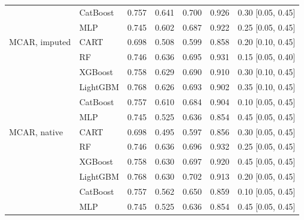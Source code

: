 \begin{table}[p]
\begin{tabular}{@{}llrrrrl@{}}
 & CatBoost & 0.757 & 0.641 & 0.700 & 0.926 & 0.30 [0.05, 0.45] \\
 & MLP & 0.745 & 0.602 & 0.687 & 0.922 & 0.25 [0.05, 0.45] \\
\midrule
MCAR, imputed & CART & 0.698 & 0.508 & 0.599 & 0.858 & 0.20 [0.10, 0.45] \\
 & RF & 0.746 & 0.636 & 0.695 & 0.931 & 0.15 [0.05, 0.40] \\
 & XGBoost & 0.758 & 0.629 & 0.690 & 0.910 & 0.30 [0.10, 0.45] \\
 & LightGBM & 0.768 & 0.626 & 0.693 & 0.902 & 0.35 [0.10, 0.45] \\
 & CatBoost & 0.757 & 0.610 & 0.684 & 0.904 & 0.10 [0.05, 0.45] \\
 & MLP & 0.745 & 0.525 & 0.636 & 0.854 & 0.45 [0.05, 0.45] \\
\midrule
MCAR, native & CART & 0.698 & 0.495 & 0.597 & 0.856 & 0.30 [0.05, 0.45] \\
 & RF & 0.746 & 0.636 & 0.696 & 0.932 & 0.25 [0.05, 0.45] \\
 & XGBoost & 0.758 & 0.630 & 0.697 & 0.920 & 0.45 [0.05, 0.45] \\
 & LightGBM & 0.768 & 0.630 & 0.702 & 0.913 & 0.20 [0.05, 0.45] \\
 & CatBoost & 0.757 & 0.562 & 0.650 & 0.859 & 0.10 [0.05, 0.45] \\
 & MLP & 0.745 & 0.525 & 0.636 & 0.854 & 0.45 [0.05, 0.45] \\
\bottomrule
\end{tabular}
\end{table}

